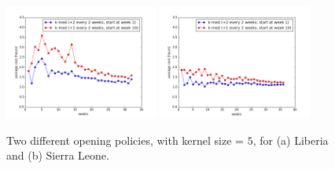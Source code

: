 \begin{figure}[h]
  \centering %
    \includegraphics[width=0.45\textwidth]{figs/plot_kmed_CAP160_s1_s10.png}
    \includegraphics[width=0.45\textwidth]{figs/plot_kmed_CAP160_s1_s10_SL.png}
    \caption{Two different opening policies, with kernel size = $5$, for
(a) Liberia and (b) Sierra Leone.}
\label{fig:online3}
\end{figure}


